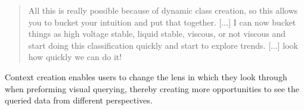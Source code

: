 \begin{quote}
All this is really possible because of dynamic class creation, so this allows you to bucket your intuition and put that together. [...] I can now bucket things as high voltage stable, liquid stable, viscous, or not viscous and start doing this classification quickly and start to explore trends. [...] look how quickly we can do it!%
\end{quote}
Context creation enables users to change the lens in which they look through when preforming visual querying, thereby creating more opportunities to see the queried data from different perspectives.

